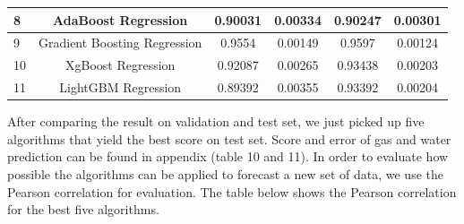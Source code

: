 \documentclass[12pt,a4paper]{report}
\begin{document}
\begin{table}[H]
\begin{adjustbox}{width=1\textwidth}
\begin{tabular}{|l|c|c|c|c|c|}
8           & AdaBoost Regression                      & 0.90031                                             & 0.00334                                             & 0.90247                                       & 0.00301                                       \\ \hline
9           & Gradient Boosting Regression             & 0.9554                                              & 0.00149                                             & 0.9597                                        & 0.00124                                       \\ \hline
10          & XgBoost Regression                       & 0.92087                                             & 0.00265                                             & 0.93438                                       & 0.00203                                       \\ \hline
11          & LightGBM Regression                      & 0.89392                                             & 0.00355                                             & 0.93392                                       & 0.00204                                       \\ \hline
\end{tabular}
\end{adjustbox}
\end{table}
After comparing the result on validation and test set, we just picked up five algorithms that yield the best score on test set. Score and error of gas and water prediction can be found in appendix (table 10 and 11).
In order to evaluate how possible the algorithms can be applied to forecast a new set of data, we use the Pearson correlation for evaluation. The table below shows the Pearson correlation for the best five algorithms.
\end{document}
